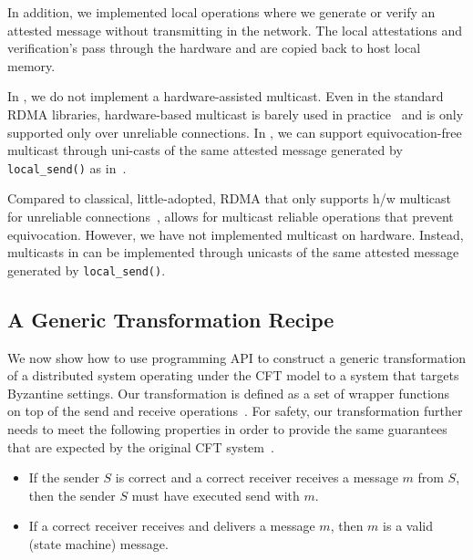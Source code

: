 In addition, we implemented local operations where we generate or verify an attested message without transmitting in the network. The local attestations and verification's pass through the \projecttitle{} hardware and are copied back to host local memory.

In \projecttitle{}, we do not implement a hardware-assisted multicast. Even in the standard RDMA libraries, hardware-based multicast is barely used in practice~\cite{f04eb9b864204bab958e72055062748c} and is only supported only over unreliable connections. In \projecttitle{}, we can support equivocation-free multicast through uni-casts of the same attested message generated by {\tt local\_send()} as in~\cite{levin2009trinc}.

Compared to classical, little-adopted, RDMA that only supports h/w multicast for unreliable connections~\cite{f04eb9b864204bab958e72055062748c}, \projecttitle{} allows for multicast reliable operations that prevent equivocation. However, we have not implemented multicast on hardware. Instead, multicasts in \projecttitle{} can be implemented through unicasts of the same attested message generated by {\tt local\_send()}.
\fi






\subsection{A Generic Transformation Recipe}
\label{subsec:transformation}
We now show how to use \projecttitle{} programming API to construct a generic transformation of a distributed system operating under the CFT model to a system that targets Byzantine settings.  Our transformation is defined as a set of wrapper functions on top of the send and receive operations~\cite{clement2012}. For safety, our transformation further needs to meet the following properties in order to provide the same guarantees that are expected by the original CFT system~\cite{clement2012, making_distributed_app_rob, 268272}.

\begin{itemize}
    \item {} If the sender $S$ is correct and a correct receiver receives a message $m$ from $S$, then the sender $S$ must have executed send with $m$.
    \item {} If a correct receiver receives and delivers a message $m$, then $m$ is a valid (state machine) message.
\end{itemize}


